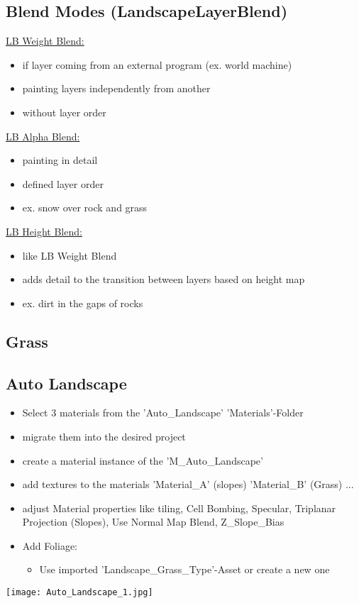         \subsection{Blend Modes (LandscapeLayerBlend)}
            \underline{LB Weight Blend:}
            \begin{itemize}
                \item if layer coming from an external program (ex. world machine) 
                \item painting layers independently from another
                \item without layer order
            \end{itemize}
            \underline{LB Alpha Blend:}
            \begin{itemize}
                \item painting in detail
                \item defined layer order
                \item ex. snow over rock and grass
            \end{itemize}
            \underline{LB Height Blend:}
            \begin{itemize}
                \item like LB Weight Blend
                \item adds detail to the transition between layers based on height map
                \item ex. dirt in the gaps of rocks
            \end{itemize}

        \subsection{Grass}
        \subsection{Auto Landscape}
            \begin{itemize}
                \item Select 3 materials from the 'Auto\_Landscape' 'Materials'-Folder
                \item migrate them into the desired project
                \item create a material instance of the 'M\_Auto\_Landscape'
                \item add textures to the materials 'Material\_A' (slopes) 'Material\_B' (Grass) ...
                \item adjust Material properties like tiling, Cell Bombing, Specular, Triplanar Projection (Slopes), Use Normal Map Blend, Z\_Slope\_Bias
                \item Add Foliage:
                \begin{itemize}
                    \item Use imported 'Landscape\_Grass\_Type'-Asset or create a new one
                \end{itemize}
            \end{itemize}
             \texttt{[image: Auto\_Landscape\_1.jpg]}

